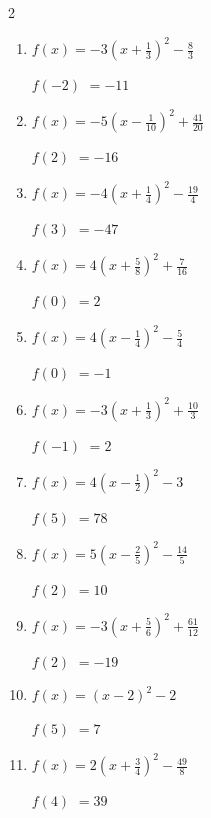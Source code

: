 \begin{multicols}{2}
\begin{enumerate}
  \item $\displaystyle f(x)=-3\left( x+\frac{1}{3}\right)^{2}-\frac{8}{3}$

$f(-2)$
        $=-11$

\columnbreak %

\resetques

  \item $\displaystyle f(x)=-5\left( x-\frac{1}{10}\right)^{2}+\frac{41}{20}$

$f(2)$
        $=-16$

  \item $\displaystyle f(x)=-4\left( x+\frac{1}{4}\right)^{2}-\frac{19}{4}$

$f(3)$
        $=-47$

  \item $\displaystyle f(x)=4\left( x+\frac{5}{8}\right)^{2}+\frac{7}{16}$

$f(0)$
        $=2$

  \item $\displaystyle f(x)=4\left( x-\frac{1}{4}\right)^{2}-\frac{5}{4}$

$f(0)$
        $=-1$

  \item $\displaystyle f(x)=-3\left( x+\frac{1}{3}\right)^{2}+\frac{10}{3}$

$f(-1)$
        $=2$

\columnbreak %

  \item $\displaystyle f(x)=4\left( x-\frac{1}{2}\right)^{2}-3$

$f(5)$
        $=78$

  \item $\displaystyle f(x)=5\left( x-\frac{2}{5}\right)^{2}-\frac{14}{5}$

$f(2)$
        $=10$

  \item $\displaystyle f(x)=-3\left( x+\frac{5}{6}\right)^{2}+\frac{61}{12}$

$f(2)$
        $=-19$

  \item $\displaystyle f(x)=\left( x-2\right)^{2}-2$

$f(5)$
        $=7$

  \item $\displaystyle f(x)=2\left( x+\frac{3}{4}\right)^{2}-\frac{49}{8}$

$f(4)$
        $=39$

\columnbreak %


\end{enumerate}
\end{multicols}
